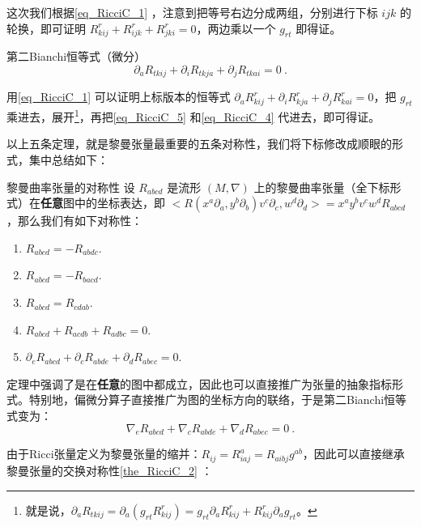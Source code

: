 这次我们根据\autoref{eq_RicciC_1} ，注意到把等号右边分成两组，分别进行下标 $ijk$ 的轮换，即可证明 $R^r_{kij}+R^r_{ijk}+R^r_{jki}=0$，两边乘以一个 $g_{rt}$ 即得证。

\begin{theorem}{第二Bianchi恒等式（微分）}\label{the_RicciC_3}
\begin{equation}\label{eq_RicciC_7}
\partial_aR_{tkij}+\partial_iR_{tkja}+\partial_jR_{tkai}=0~.
\end{equation}
\end{theorem}

用\autoref{eq_RicciC_1} 可以证明上标版本的恒等式 $\partial_aR_{kij}^r+\partial_iR_{kja}^r+\partial_jR_{kai}^r=0$，把 $g_{rt}$ 乘进去，展开\footnote{就是说，$\partial_aR_{tkij}=\partial_a(g_{rt}R^{r}_{kij})=g_{rt}\partial_aR^r_{kij}+R^r_{kij}\partial_ag_{rt}$。}，再把\autoref{eq_RicciC_5} 和\autoref{eq_RicciC_4} 代进去，即可得证。


以上五条定理，就是黎曼张量最重要的五条对称性，我们将下标修改成顺眼的形式，集中总结如下：



\begin{corollary}{黎曼曲率张量的对称性}
设 $R_{abcd}$ 是流形 $(M, \nabla)$ 上的黎曼曲率张量（全下标形式）在\textbf{任意}图中的坐标表达，即 $<R(x^a\partial_a, y^b\partial_b)v^c\partial_c, w^d\partial_d>=x^ay^bv^cw^dR_{abcd}$，那么我们有如下对称性：
\begin{enumerate}
\item $R_{abcd}=-R_{abdc}$.
\item $R_{abcd}=-R_{bacd}$.
\item $R_{abcd}=R_{cdab}$.
\item $R_{abcd}+R_{acdb}+R_{adbc}=0$.
\item $\partial_eR_{abcd}+\partial_cR_{abde}+\partial_dR_{abec}=0$.
\end{enumerate}
\end{corollary}





定理中强调了是在\textbf{任意}的图中都成立，因此也可以直接推广为张量的抽象指标形式。特别地，偏微分算子直接推广为图的坐标方向的联络，于是第二Bianchi恒等式变为：
\begin{equation}\label{eq_RicciC_8}
\nabla_eR_{abcd}+\nabla_cR_{abde}+\nabla_dR_{abec}=0~.
\end{equation}

由于Ricci张量定义为黎曼张量的缩并：$R_{ij}=R^a_{iaj}=R_{aibj}g^{ab}$，因此可以直接继承黎曼张量的交换对称性\autoref{the_RicciC_2} ：

